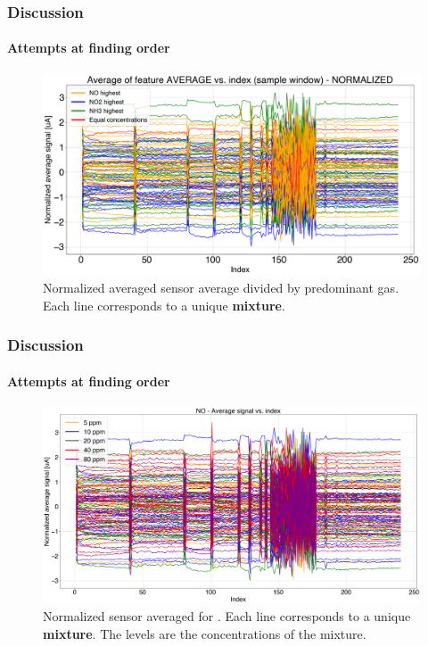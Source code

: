 \documentclass{beamer}
\begin{document}
\begin{frame}
	\frametitle{Discussion}
	\framesubtitle{Attempts at finding order}
	
		\begin{figure}
		\includegraphics[width=1\linewidth]{../../figures/order1-norm.png}
		\caption{Normalized averaged sensor average divided by predominant gas. Each line corresponds to a unique \textbf{mixture}.}
	\end{figure}
\end{frame}

\begin{frame}
	\frametitle{Discussion}
	\framesubtitle{Attempts at finding order}
	\begin{figure}
	\includegraphics[width=1\linewidth]{../../figures/order2NO.png}
	\caption{Normalized sensor averaged for . Each line corresponds to a unique \textbf{mixture}. The levels are the  concentrations of the mixture.}
\end{figure}
\end{frame}

\end{document}
